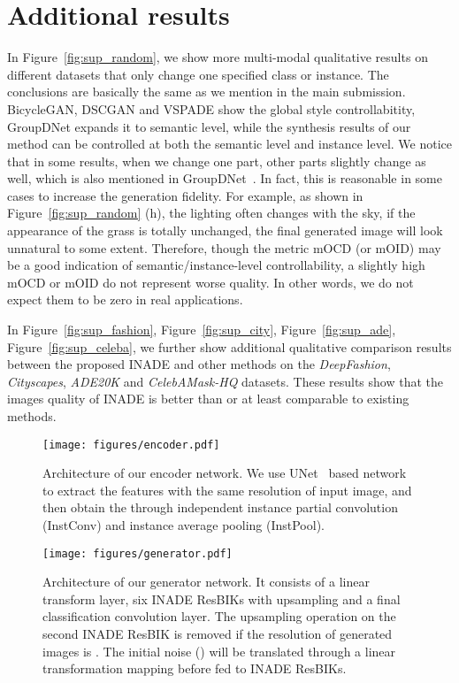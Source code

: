 \documentclass[final]{cvpr}
\begin{document}
\section{Additional results}
In Figure~\ref{fig:sup_random}, we show more multi-modal qualitative results on different datasets that only change one specified class or instance. The conclusions are basically the same as we mention in the main submission. BicycleGAN, DSCGAN and VSPADE show the global style controllabitity, GroupDNet expands it to semantic level, while the synthesis results of our method can be controlled at both the semantic level and instance level. We notice that in some results, when we change one part, other parts slightly change as well, which is also mentioned in GroupDNet~\cite{zhu2020semantically}. In fact, this is reasonable in some cases to 
increase the generation fidelity. For example, as shown in Figure~\ref{fig:sup_random} (h), the lighting often changes with the sky, if the appearance of the grass is totally unchanged, the final generated image will look unnatural to some extent. Therefore, though the metric mOCD (or mOID) may be a good indication of semantic/instance-level controllability, a slightly high mOCD or mOID do not represent worse quality. In other words, we do not expect them to be zero in real applications. 

In Figure~\ref{fig:sup_fashion}, Figure~\ref{fig:sup_city}, Figure~\ref{fig:sup_ade}, Figure~\ref{fig:sup_celeba}, we further show additional qualitative comparison results between the proposed INADE and other methods on the \textit{DeepFashion}, \textit{Cityscapes}, \textit{ADE20K} and \textit{CelebAMask-HQ} datasets. These results show that the images quality of INADE is better than or at least comparable to existing methods.

\begin{figure}[tp]
  \centering
  \texttt{[image: figures/encoder.pdf]}
  \caption{Architecture of our encoder network. We use UNet~\cite{ronneberger2015u} based network to extract the features with the same resolution of input image, and then obtain the  through independent instance partial convolution (InstConv) and instance average pooling (InstPool).}
  \label{fig:encoder}
\end{figure}

\begin{figure}[tp]
  \centering
  \texttt{[image: figures/generator.pdf]}
  \caption{Architecture of our generator network. It consists of a linear transform layer, six INADE ResBIKs with upsampling and a final classification convolution layer. The upsampling operation on the second INADE ResBIK is removed if the resolution of generated images is . The initial noise () will be translated through a linear transformation mapping before fed to INADE ResBIKs.}
  \label{fig:generator}
\end{figure}
\end{document}
